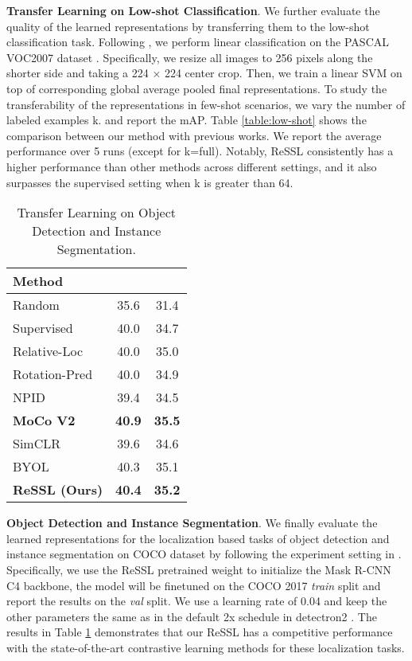 \documentclass{article}
\newcommand{\<}{\left\langle}
\renewcommand{\>}{\right\rangle}
\begin{document}
\textbf{Transfer Learning on Low-shot Classification}. 
We further evaluate the quality of the learned representations by transferring them to the low-shot classification task. Following \cite{PCL}, we perform linear classification on the PASCAL VOC2007 dataset \cite{pascal-voc-2007}. Specifically, we resize all images to 256 pixels along the shorter side and taking a 224 × 224 center crop. Then, we train a linear SVM on top of corresponding global average pooled final representations. To study the transferability of the representations in few-shot scenarios, we vary the number of labeled examples k. and report the mAP. Table \ref{table:low-shot} shows the comparison between our method with previous works. We report the average performance over 5 runs (except for k=full). Notably, ReSSL consistently has a higher performance than other methods across different settings, and it also surpasses the supervised setting when k is greater than 64.




\renewcommand\arraystretch{1.0}
\begin{table}[h]
 \centering
 \setlength\tabcolsep{10pt}
 \vspace{-5pt}
 \caption{Transfer Learning on Object Detection and Instance Segmentation.}
 \vspace{-10pt}
 \label{table:detection}
\begin{tabular}{l  c  c} 
\toprule 
Method &  &  \\
\hline
Random & 35.6 & 31.4 \\
Supervised & 40.0 & 34.7 \\  \hline
Relative-Loc \cite{patch_prediction} & 40.0 & 35.0 \\
Rotation-Pred \cite{rotation_selfsup} & 40.0 & 34.9 \\
NPID \cite{instance_discrimination} & 39.4 & 34.5 \\
\textbf{MoCo V2} \cite{mocov2} & \textbf{40.9}  & \textbf{35.5}  \\
SimCLR \cite{simclr} & 39.6 & 34.6 \\
BYOL \cite{byol} & 40.3 & 35.1 \\
\textbf{ReSSL (Ours)} & \textbf{40.4}  & \textbf{35.2} \\
\bottomrule
\end{tabular}
\end{table}


\textbf{Object Detection and Instance Segmentation}.
We finally evaluate the learned representations for the localization based tasks of object detection and instance segmentation on COCO \cite{coco} dataset by following the experiment setting in \cite{moco}. Specifically, we use the ReSSL pretrained weight to initialize the Mask R-CNN \cite{maskrcnn} C4 backbone, the model will be finetuned on the COCO 2017 \emph{train} split and report the results on the \emph{val} split. We use a learning rate of 0.04 and keep the other parameters the same as in the  default 2x schedule in detectron2 \cite{detectron2}. The results in Table \ref{table:detection} demonstrates that our ReSSL has a competitive performance with the state-of-the-art contrastive learning methods for these localization tasks.
\end{document}
